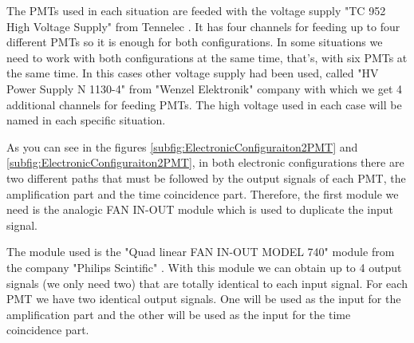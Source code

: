 The PMTs used in each situation are feeded with the voltage supply "TC 952 High Voltage Supply" from Tennelec \cite{DataSheetHVSupplyTennelec}. It has four channels for feeding up to four different PMTs so it is enough for both configurations. In some situations we need to work with both configurations at the same time, that's, with six PMTs at the same time.  In this cases other voltage supply had been used, called  "HV Power Supply N 1130-4" from "Wenzel Elektronik" \cite{DataSheetHVSupplyWenzel} company with which we get 4 additional channels for feeding PMTs. The high voltage used in each case will be named in each specific situation.

As you can see in the figures \ref{subfig:ElectronicConfiguraiton2PMT} and \ref{subfig:ElectronicConfiguraiton2PMT}, in both electronic configurations there are two different paths that must be followed by the output signals of each PMT, the amplification part and the time coincidence part. Therefore, the first module we need is the analogic FAN IN-OUT module which is used to duplicate the input signal.

The module used is the "Quad linear FAN IN-OUT MODEL 740" module from the company "Philips Scintific" \cite{DataSheetFANINOUT}. With this module we can obtain up to 4 output signals (we only need two) that are totally identical to each input signal. For each PMT we have two identical output signals. One will be used as the input for the amplification part and the other will be used as the input for the time coincidence part.

